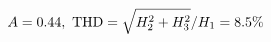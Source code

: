 \documentclass[preview]{standalone}
\begin{document}
\begin{align*}
\special{dvisvgm:raw <g id='unique000'>}A=0.44,\ \text{THD}=\sqrt{H_2^2+H_3^2}/H_1=8.5\%\special{dvisvgm:raw </g>}
\end{align*}
\end{document}
